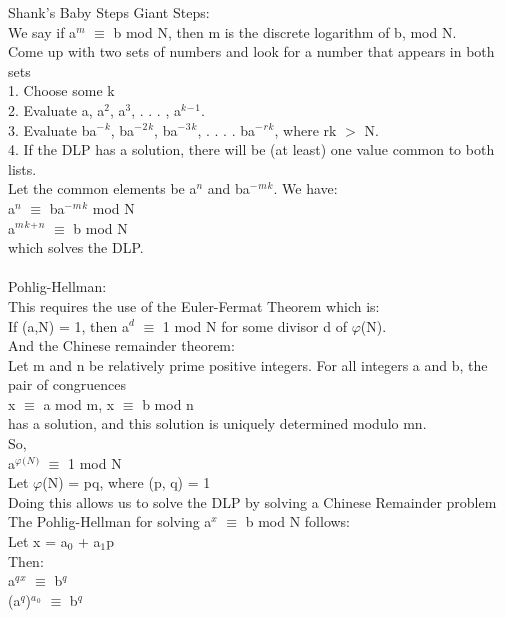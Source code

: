 \documentclass{article}
\begin{document}
\begin{itemize}
    
    Shank's Baby Steps Giant Steps: \\
    We say if a$^m$ $\equiv$ b mod N, then m is the discrete logarithm of b, mod N.\\
    Come up with two sets of numbers and look for a number that appears in both sets\\
    1.	Choose some k \\
    2.	Evaluate a, a$^2$, a$^3$, . . . , a${^k}{^-}{^1}$. \\
    3.	Evaluate  ba${^-}{^k}$, ba${^-}{^2}{^k}$, ba${^-}{^3}{^k}$, . . . . ba${^-}{^r}{^k}$, where rk $>$ N. \\
    4.	If the DLP has a solution, there will be (at least) one value common to both lists. \\
    Let the common elements be a$^n$ and ba${^-}{^m}{^k}$. We have: \\
    a$^n$ $\equiv$ ba${^-}{^m}{^k}$ mod N \\
	  a${^m}{^k}{^+}{^n}$ $\equiv$ b mod N \\
    which solves the DLP. \\
    \\
    Pohlig-Hellman: \\
    This requires the use of the Euler-Fermat Theorem which is: \\
    If (a,N) = 1, then a$^d$ $\equiv$ 1 mod N for some divisor d of $\varphi$(N). \\
    And the Chinese remainder theorem: \\
    Let m and n be relatively prime positive integers. For all integers a and b, the pair of congruences \\
    x $\equiv$ a mod m, x $\equiv$ b mod n \\
    has a solution, and this solution is uniquely determined modulo mn.\\
    So, \\
    a${^\varphi}{^(}{^N}{^)}$ $\equiv$ 1 mod N \\
    Let $\varphi$(N) = pq, where (p, q) = 1 \\
    Doing this allows us to solve the DLP by solving a Chinese Remainder problem \\
    The Pohlig-Hellman for solving a$^x$ $\equiv$ b mod N follows: \\
    Let x = a$_0$ + a$_1$p  \\
    Then:  \\
    a${^q}{^x}$ $\equiv$ b$^q$ \\
    (a$^q$)${^a}{^{_0}}$  $\equiv$ b$^q$ \\

\end{itemize}
\end{document}
